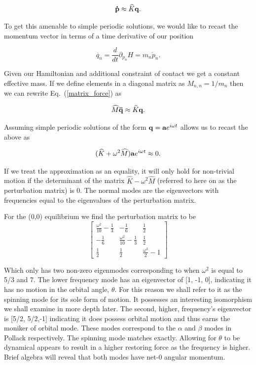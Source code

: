 \documentclass[prbg,preprint]{revtex4-1}
\newcommand{\cvec}[1]{{\rm{\bf{#1}}}}
\begin{document}
\begin{equation} \label{matrix_force}
	\cvec{ \dot{ p }} \approx \widehat K \cvec q.
\end{equation}

To get this amenable to simple periodic solutions, we would like to recast the momentum vector in terms of a time derivative of our position

\begin{equation}
	\ddot{ q_n } =\frac{d}{dt} \partial_{p_n} H = m_n \dot p_n.
\end{equation}

Given our Hamiltonian and additional constraint of contact we get a constant effective mass. If we define elements in a diagonal matrix as 
$M_{n,n}=1/m_n$
then we can rewrite Eq.~(\ref{matrix_force}) as 

\begin{equation}
	\widehat M \cvec{ \ddot{ q }} \approx \widehat K \cvec q.
\end{equation}

Assuming simple periodic solutions of the form $\cvec q = \cvec a e^{i\omega t}$ allows us to recast the above as

\begin{equation}
	( 
	\widehat K + \omega^2 \widehat M
	)  \cvec{ a}e^{i\omega t} \approx 0 .
\end{equation}

If we treat the approximation as an equality, it will only hold for non-trivial motion if the determinant of the matrix $\widehat K - \omega^2 \widehat M$ (referred to here on as the perturbation matrix) is 0. The normal modes are the eigenvectors with frequencies equal to the eigenvalues of the perturbation matrix.

For the (0,0) equilibrium we find the perturbation matrix to be
\begin{equation}
	\left[\begin{matrix}
	\frac{\omega^{2}}{10} - \frac{1}{3} & - \frac{1}{6} & \frac{1}{2}\\
	- \frac{1}{6} & \frac{\omega^{2}}{10} - \frac{1}{3} & \frac{1}{2}\\
	\frac{1}{2} & \frac{1}{2} & \frac{\omega^{2}}{2} - 1
	\end{matrix}\right]
\end{equation}

Which only has two non-zero eigenmodes corresponding to when $\omega^2$ is equal to 5/3 and 7. The lower frequency mode has an eigenvector of [1, -1, 0], indicating it has no motion in the orbital angle, $\theta$. For this reason we shall refer to it as the spinning mode for its sole form of motion. It possesses an interesting isomorphism we shall examine in more depth later. The second, higher, frequency's eigenvector is [5/2, 5/2,-1] indicating it does possess orbital motion and thus earns the moniker of orbital mode. These modes correspond to the $\alpha$ and $\beta$ modes in Pollack \cite{doi:10.1139/p96-151} respectively. The spinning mode matches exactly. 
Allowing for $\theta$ to be dynamical appears to result in a higher restoring force as the frequency is higher.
Brief algebra will reveal that both modes have net-0 angular momentum.
\end{document}
